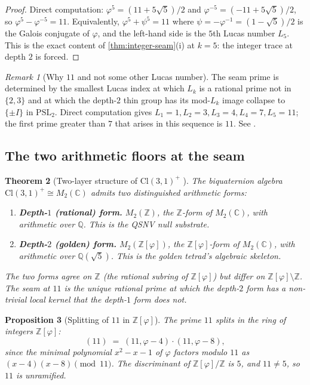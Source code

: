 \documentclass[11pt,a4paper]{article}
\theoremstyle{plain}
\newtheorem{theorem}{Theorem}[section]
\newtheorem{proposition}[theorem]{Proposition}
\theoremstyle{definition}
\theoremstyle{remark}
\newtheorem{remark}[theorem]{Remark}
\numberwithin{equation}{section}
\providecommand{\Cl}{\mathrm{Cl}}
\providecommand{\C}{\mathbb{C}}
\providecommand{\Z}{\mathbb{Z}}
\providecommand{\Q}{\mathbb{Q}}
\providecommand{\vp}{\varphi}
\providecommand{\ps}{\psi}
\providecommand{\Lk}{L}
\begin{document}
\begin{proof}
Direct computation: $\vp^5 = (11 + 5\sqrt{5})/2$ and
$\vp^{-5} = (-11 + 5\sqrt{5})/2$, so
$\vp^5 - \vp^{-5} = 11$.  Equivalently, $\vp^5 + \ps^5 = 11$ where
$\ps = -\vp^{-1} = (1 - \sqrt 5)/2$ is the Galois conjugate of
$\vp$, and the left-hand side is the $5$th Lucas number $\Lk_5$.
This is the exact content of \cref{thm:integer-seam}(i) at $k = 5$:
the integer trace at depth $2$ is forced.
\end{proof}

\begin{remark}[Why $11$ and not some other Lucas number]
\label{rmk:why-11}
The seam prime is determined by the smallest Lucas index at which
$\Lk_k$ is a rational prime not in $\{2, 3\}$ and at which the
depth-$2$ thin group has its mod-$\Lk_k$ image collapse to
$\{\pm I\}$ in $\mathrm{PSL}_2$.  Direct computation gives
$\Lk_1 = 1, \Lk_2 = 3, \Lk_3 = 4, \Lk_4 = 7, \Lk_5 = 11$; the first
prime greater than $7$ that arises in this sequence is $11$.  See
\cite{seam-paper}.
\end{remark}

\subsection{The two arithmetic floors at the seam}

\begin{theorem}[Two-layer structure of $\Cl(3,1)^+$ {\cite[\S2]{seam-paper}}]
\label{thm:two-layer}
The biquaternion algebra $\Cl(3,1)^+ \cong M_2(\C)$ admits two
distinguished arithmetic forms:
\begin{enumerate}[label=\textnormal{(\arabic*)}]
  \item \textbf{Depth-$1$ (rational) form.}  $M_2(\Z)$, the
    $\Z$-form of $M_2(\C)$, with arithmetic over $\Q$.  This is
    the QSNV null substrate.
  \item \textbf{Depth-$2$ (golden) form.}  $M_2(\Z[\vp])$, the
    $\Z[\vp]$-form of $M_2(\C)$, with arithmetic over
    $\Q(\sqrt 5)$.  This is the golden tetrad's algebraic
    skeleton.
\end{enumerate}
The two forms agree on $\Z$ (the rational subring of $\Z[\vp]$)
but differ on $\Z[\vp] \setminus \Z$.  The seam at $11$ is the
unique rational prime at which the depth-$2$ form has a non-trivial
local kernel that the depth-$1$ form does not.
\end{theorem}

\begin{proposition}[Splitting of $11$ in {$\Z[\vp]$}]
\label{prop:splitting-11}
The prime $11$ splits in the ring of integers $\Z[\vp]$:
\begin{equation}
  (11) \;=\; (11, \vp - 4) \cdot (11, \vp - 8),
  \label{eq:11-splits}
\end{equation}
since the minimal polynomial $x^2 - x - 1$ of $\vp$ factors
modulo $11$ as $(x - 4)(x - 8) \pmod{11}$.  The discriminant of
$\Z[\vp] / \Z$ is $5$, and $11 \ne 5$, so $11$ is unramified.
\end{proposition}
\end{document}
